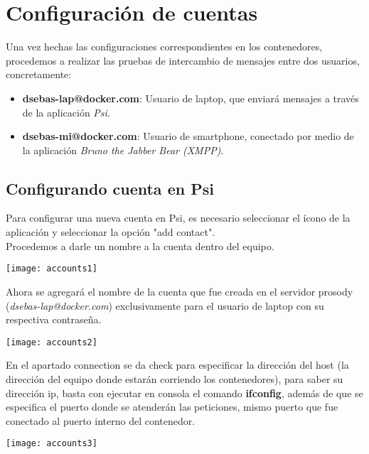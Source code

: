 \documentclass[10pt,letterpaper]{article}
\begin{document}
\section{Configuración de cuentas}

Una vez hechas las configuraciones correspondientes en los contenedores, procedemos a realizar las pruebas de intercambio de mensajes entre dos usuarios, concretamente:

\begin{itemize}
\item \textbf{dsebas-lap@docker.com}: Usuario de laptop, que enviará mensajes a través de la aplicación \textit{Psi}.

\item \textbf{dsebas-mi@docker.com}: Usuario de smartphone, conectado por medio de la aplicación \textit{Bruno the Jabber Bear (XMPP)}.
\end{itemize}

\subsection{Configurando cuenta en Psi}
Para configurar una nueva cuenta en Psi, es necesario seleccionar el ícono de la aplicación y seleccionar la opción "add contact".\\

Procedemos a darle un nombre a la cuenta dentro del equipo.
\begin{center}
\texttt{[image: accounts1]}
\end{center}

Ahora se agregará el nombre de la cuenta que fue creada en el servidor prosody (\textit{dsebas-lap@docker.com}) exclusivamente para el usuario de laptop con su respectiva contraseña.

\begin{center}
\texttt{[image: accounts2]}
\end{center}

En el apartado connection se da check para especificar la dirección del host (la dirección del equipo donde estarán corriendo los contenedores), para saber su dirección ip, basta con ejecutar en consola el comando \textbf{ifconfig}, además de que se especifica el puerto donde se atenderán las peticiones, mismo puerto que fue conectado al puerto interno del contenedor.

\begin{center}
\texttt{[image: accounts3]}
\end{center}
\end{document}
